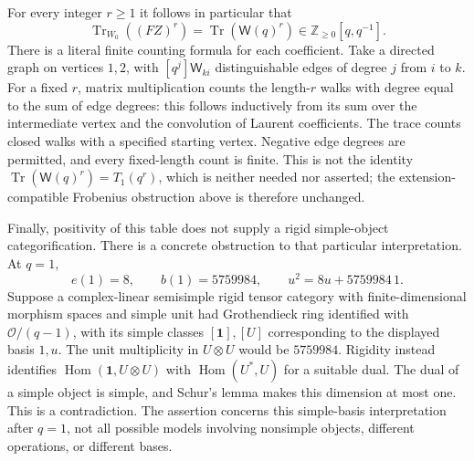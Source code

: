 \documentclass[11pt,a4paper]{article}
\begin{document}
For every integer $r\ge1$ it follows in particular that
\[
 \operatorname{Tr}_{W_0}((FZ)^r)
       =\operatorname{Tr}(\mathsf W(q)^r)
       \in\mathbb Z_{\ge0}[q,q^{-1}].
                                                               \tag{P-F52af}
\]
There is a literal finite counting formula for each coefficient.
Take a directed graph on vertices $1,2$, with
$[q^j]\mathsf W_{ki}$ distinguishable edges of degree $j$
from $i$ to $k$. For a fixed $r$, matrix multiplication
counts the length-$r$ walks with degree equal to the sum of
edge degrees: this follows inductively from its sum over the
intermediate vertex and the convolution of Laurent
coefficients. The trace counts closed walks with a specified
starting vertex. Negative edge degrees are permitted, and
every fixed-length count is finite. This is not the identity
$\operatorname{Tr}(\mathsf W(q)^r)=T_1(q^r)$, which is
neither needed nor asserted; the extension-compatible
Frobenius obstruction above is therefore unchanged.

Finally, positivity of this table does not supply a rigid
simple-object categorification. There is a concrete obstruction
to that particular interpretation. At $q=1$,
\[
             e(1)=8,\qquad b(1)=5759984,
             \qquad u^2=8u+5759984\,1.
                                                               \tag{P-F52ag}
\]
Suppose a complex-linear semisimple rigid tensor category
with finite-dimensional morphism spaces and simple unit
had Grothendieck ring identified with $\mathcal O/(q-1)$,
with its simple classes $[\mathbf1],[U]$ corresponding to
the displayed basis $1,u$.
The unit multiplicity in $U\otimes U$ would be $5759984$.
Rigidity instead identifies
$\operatorname{Hom}(\mathbf1,U\otimes U)$ with
$\operatorname{Hom}(U^*,U)$ for a suitable dual.
The dual of a simple object is simple, and Schur's lemma
makes this dimension at most one. This is a contradiction.
The assertion concerns this simple-basis interpretation
after $q=1$, not all possible models involving nonsimple
objects, different operations, or different bases.
\end{document}
